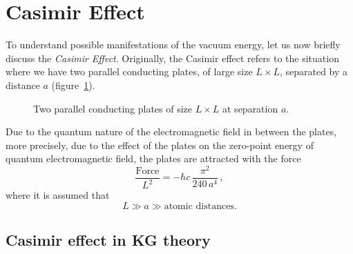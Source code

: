 \section{Casimir Effect}

To understand possible manifestations of the vacuum energy, let us now
briefly discuss the \emph{Casimir Effect}. Originally, the Casimir effect
refers to the situation where we have two parallel conducting plates, of large
size $L\times L$, separated by a distance $a$ (figure~\ref{fig:plates}).
\begin{figure}[ht]
\centering{}
\caption{Two parallel conducting plates of size $L\times L$ at separation $a$.}
\label{fig:plates}
\end{figure}
Due to the quantum nature of the electromagnetic field in between the plates,
more precisely, due to the effect of the plates on the zero-point energy of
quantum electromagnetic field, the plates are attracted with the force
\[
\frac{\text{Force}}{L^2}=-\hbar c\,\frac{\pi^2}{240\,a^4}\,,
\]
where it is assumed that
\[
L\gg a\gg\text{atomic distances.}
\]

\subsection*{Casimir effect in KG theory}

